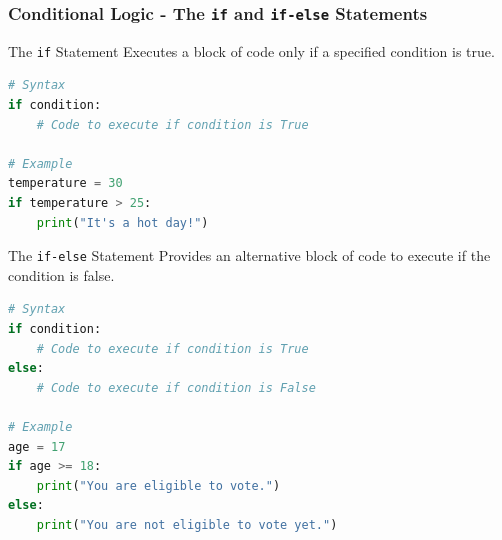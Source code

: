 \documentclass{beamer}
\begin{document}
\begin{frame}[fragile]
    \frametitle{Conditional Logic - The \texttt{if} and \texttt{if-else} Statements}
    
    \begin{block}{The \texttt{if} Statement}
        Executes a block of code only if a specified condition is true.
        \begin{lstlisting}[language=Python]
# Syntax
if condition:
    # Code to execute if condition is True

# Example
temperature = 30
if temperature > 25:
    print("It's a hot day!")
        \end{lstlisting}
    \end{block}
    
    \begin{block}{The \texttt{if-else} Statement}
        Provides an alternative block of code to execute if the condition is false.
        \begin{lstlisting}[language=Python]
# Syntax
if condition:
    # Code to execute if condition is True
else:
    # Code to execute if condition is False

# Example
age = 17
if age >= 18:
    print("You are eligible to vote.")
else:
    print("You are not eligible to vote yet.")
        \end{lstlisting}
    \end{block}
    
\end{frame}
\end{document}
